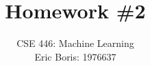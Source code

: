 \title{Homework \#2} 
\author{\normalsize{CSE 446: Machine Learning}\\ 
\normalsize{Eric Boris: 1976637}}
\maketitle
